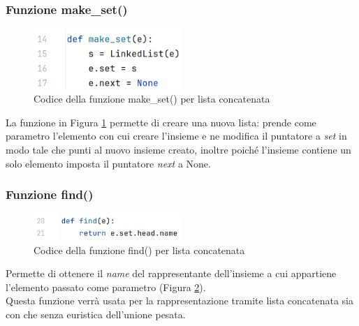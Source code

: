 \documentclass[12pt]{article}
\begin{document}
\subsubsection{Funzione make\_set()}
\begin{figure}[h]
    \centering
    \includegraphics[width=0.5\textwidth]{images/linked_list_code_images/ll_make_set.png}
    \caption{Codice della funzione make\_set() per lista concatenata}
    \label{fig:ll_make_set}
\end{figure}
La funzione in Figura \ref{fig:ll_make_set} permette di creare una nuova lista: prende come parametro l'elemento con cui creare l'insieme e ne modifica il puntatore a \textit{set} in modo tale che punti al nuovo insieme creato, inoltre poiché l'insieme contiene un solo elemento imposta il puntatore \textit{next} a None.

\subsubsection{Funzione find()}
\begin{figure}[h]
    \centering
    \includegraphics[width=0.5\textwidth]{images/linked_list_code_images/ll_find.png}
    \caption{Codice della funzione find() per lista concatenata}
    \label{fig:ll_find}
\end{figure}
Permette di ottenere il \textit{name} del rappresentante dell'insieme a cui appartiene l'elemento passato come parametro (Figura \ref{fig:ll_find}).\\
Questa funzione verrà usata per la rappresentazione tramite lista concatenata sia con che senza euristica dell'unione pesata.
\end{document}
